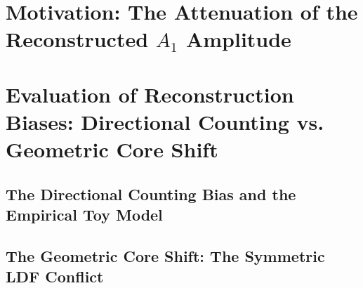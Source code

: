 \documentclass[11pt,a4paper]{article}
\begin{document}
\section{Motivation: The Attenuation of the Reconstructed $A_1$ Amplitude}
\label{sec:motivation}



\section{Evaluation of Reconstruction Biases: Directional Counting vs. Geometric Core Shift}
\label{sec:biases}

\subsection{The Directional Counting Bias and the Empirical Toy Model}
\label{subsec:toy_model}

\subsection{The Geometric Core Shift: The Symmetric LDF Conflict}
\label{subsec:core_shift}
\end{document}
